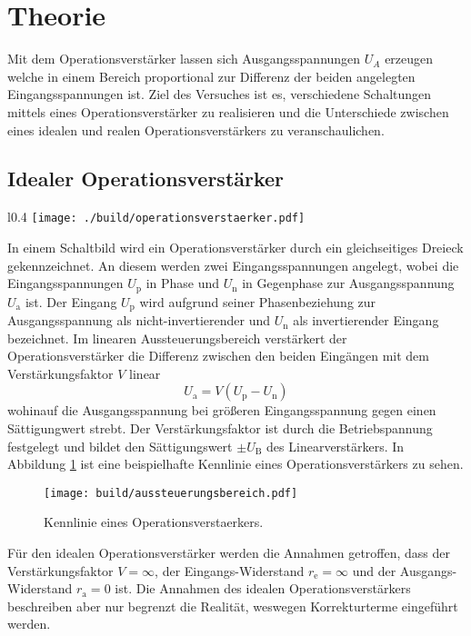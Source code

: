 \section{Theorie}\label{sec:theorie}
Mit dem Operationsverstärker lassen sich Ausgangsspannungen $U_A$
erzeugen welche in einem Bereich proportional zur Differenz der beiden
angelegten Eingangsspannungen ist. 
Ziel des Versuches ist es, verschiedene Schaltungen mittels eines
Operationsverstärker zu realisieren und die Unterschiede zwischen eines idealen
und realen Operationsverstärkers zu veranschaulichen.

\subsection{Idealer Operationsverstärker}%
\label{sub:idealer_operationsverstaerker}

\begin{wrapfigure}{l}{0.4\textwidth}
		\centering
		\texttt{[image: ./build/operationsverstaerker.pdf]}
		\caption{Schaltbild eines idealen Operationsverstärkers.
		\cite{anleitung}}
		\label{fig:opv}
\end{wrapfigure}
In einem Schaltbild wird ein Operationsverstärker durch ein gleichseitiges
Dreieck gekennzeichnet. 
An diesem werden zwei Eingangsspannungen angelegt, wobei die
Eingangsspannungen $U_\text{p}$ in Phase
und $U_\text{n}$ in Gegenphase zur Ausgangsspannung
$U_\text{a}$ ist.
Der Eingang $U_\text{p}$ wird aufgrund seiner Phasenbeziehung zur Ausgangsspannung
als nicht-invertierender und $U_\text{n}$ als invertierender Eingang bezeichnet. 
Im linearen Aussteuerungsbereich verstärkert der Operationsverstärker die
Differenz zwischen den beiden Eingängen mit dem Verstärkungsfaktor $V$ linear
\begin{equation}
		\label{eq:diff}
		U_\text{a} = V \left( U_\text{p} - U_\text{n} \right)
\end{equation}
wohinauf die Ausgangsspannung bei größeren Eingangsspannung gegen einen
Sättigungwert strebt.
Der Verstärkungsfaktor ist durch die Betriebspannung festgelegt
und bildet den Sättigungswert $\pm U_\text{B}$  des Linearverstärkers.
In Abbildung \ref{fig:kennlinie} ist eine beispielhafte Kennlinie eines
Operationsverstärkers zu sehen. 
\begin{figure}[h]
		\centering
		\texttt{[image: build/aussteuerungsbereich.pdf]}
		\caption{Kennlinie eines Operationsverstaerkers. \cite{anleitung}}
		\label{fig:kennlinie}
\end{figure}
Für den idealen Operationsverstärker werden die Annahmen getroffen, dass der
Verstärkungsfaktor $V = \infty$, der Eingangs-Widerstand $r_\text{e} =
\infty$ und der Ausgangs-Widerstand $r_\text{a} = 0$ ist.
Die Annahmen des idealen Operationsverstärkers beschreiben aber nur begrenzt
die Realität, weswegen Korrekturterme eingeführt werden. 


